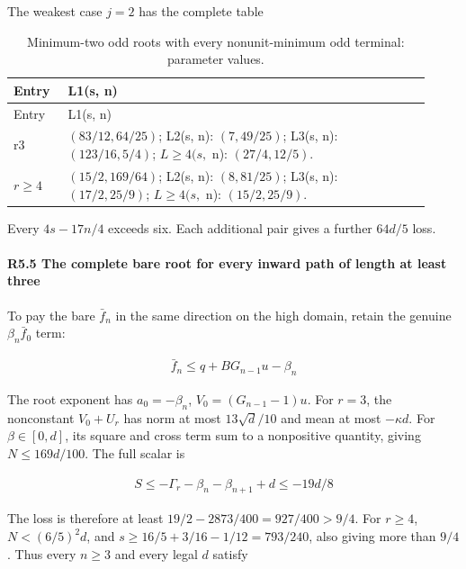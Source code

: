 The weakest case \(j=2\) has the complete table


\begingroup\small
\setlength{\tabcolsep}{3pt}
\setlength{\LTleft}{0pt}\setlength{\LTright}{\fill}
\begin{longtable}{@{}p{0.1200\linewidth}p{0.8000\linewidth}@{}}
\caption{Minimum-two odd roots with every nonunit-minimum odd terminal: parameter values.}\label{tab:parameters:r2-c005:4}\\
\toprule
Entry & L1(s, n) \\
\midrule\endfirsthead
\toprule
Entry & L1(s, n) \\
\midrule\endhead
\bottomrule\endfoot
r3 & \((83/12,\allowbreak 64/25)\); L2(s, n): \((7,\allowbreak 49/25)\); L3(s, n): \((123/16,\allowbreak 5/4)\); \(L\ge 4(s,\allowbreak \) n): \((27/4,\allowbreak 12/5)\). \\
\addlinespace[2pt]
\(r\ge 4\) & \((15/2,\allowbreak 169/64)\); L2(s, n): \((8,\allowbreak 81/25)\); L3(s, n): \((17/2,\allowbreak 25/9)\); \(L\ge 4(s,\allowbreak \) n): \((15/2,\allowbreak 25/9)\). \\
\end{longtable}
\endgroup


Every \(4s-17n/4\) exceeds six. Each additional pair gives a further \(64d/5\) loss.

\paragraph{R5.5 The complete bare root for every inward path of length at least three}

To pay the bare \(\bar f_n\) in the same direction on the high domain, retain the genuine \(\beta_n\bar f_0\) term:

\[
\begin{gathered}
\bar f_n\le q+BG_{n-1}u-\beta_n
\end{gathered}
\]

The root exponent has \(a_0=-\beta_n\), \(V_0=(G_{n-1}-1)u\). For \(r=3\), the nonconstant \(V_0+U_r\) has norm at most \(13\sqrt d/10\) and mean at most \(-\kappa d\). For \(\beta\in[0,\allowbreak \allowbreak  d]\), its square and cross term sum to a nonpositive quantity, giving \(N\le169d/100\). The full scalar is

\[
\begin{gathered}
S\le -\Gamma_r-\beta_n-\beta_{n+1}+d\le -19d/8
\end{gathered}
\]

The loss is therefore at least \(19/2-2873/400=927/400>9/4\). For \(r\ge4\), \(N<(6/5)^2d\), and \(s\ge16/5+3/16-1/12=793/240\), also giving more than \(9/4\). Thus every \(n\ge3\) and every legal \(d\) satisfy

